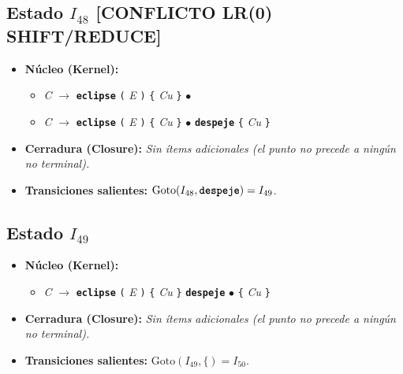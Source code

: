\documentclass[12pt, letterpaper]{article}
\begin{document}
\subsection*{Estado $I_{48}$  \hfill {\color{accent}\textbf{[CONFLICTO LR(0) SHIFT/REDUCE]}}}
\begin{itemize}\setlength{\itemsep}{1pt}\setlength{\parskip}{0pt}
\item \textbf{Núcleo (Kernel):}
\begin{itemize}\setlength{\itemsep}{1pt}\setlength{\parskip}{0pt}
    \item \textit{C} $\to$ \textbf{\texttt{eclipse}} \texttt{(} \textit{E} \texttt{)} \texttt{\{} \textit{Cu} \texttt{\}} $\bullet$ 
    \item \textit{C} $\to$ \textbf{\texttt{eclipse}} \texttt{(} \textit{E} \texttt{)} \texttt{\{} \textit{Cu} \texttt{\}} $\bullet$ \textbf{\texttt{despeje}} \texttt{\{} \textit{Cu} \texttt{\}}
\end{itemize}
\item \textbf{Cerradura (Closure):} \emph{Sin ítems adicionales (el punto no precede a ningún no terminal).}
\item \textbf{Transiciones salientes:} $\text{Goto}(I_{48}, \textbf{\texttt{despeje}}) = I_{49}$.
\end{itemize}
\vspace{2pt}
\subsection*{Estado $I_{49}$ }
\begin{itemize}\setlength{\itemsep}{1pt}\setlength{\parskip}{0pt}
\item \textbf{Núcleo (Kernel):}
\begin{itemize}\setlength{\itemsep}{1pt}\setlength{\parskip}{0pt}
    \item \textit{C} $\to$ \textbf{\texttt{eclipse}} \texttt{(} \textit{E} \texttt{)} \texttt{\{} \textit{Cu} \texttt{\}} \textbf{\texttt{despeje}} $\bullet$ \texttt{\{} \textit{Cu} \texttt{\}}
\end{itemize}
\item \textbf{Cerradura (Closure):} \emph{Sin ítems adicionales (el punto no precede a ningún no terminal).}
\item \textbf{Transiciones salientes:} $\text{Goto}(I_{49}, \texttt{\{}) = I_{50}$.
\end{itemize}
\vspace{2pt}
\end{document}

